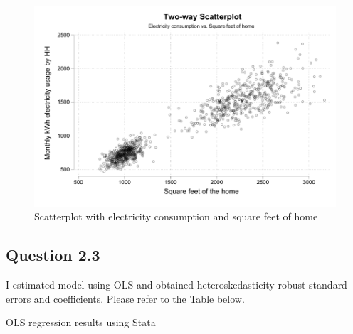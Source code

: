 \documentclass{article}
\begin{document}
\begin{figure}[hbt!]
    \centering
    \includegraphics[scale = 0.7]{homework 2/output/figure/scatterplot.pdf}
    \caption{Scatterplot with electricity consumption and square feet of home}
    \label{tab:scatter}
\end{figure}

\FloatBarrier
\subsection*{Question 2.3}
I estimated model using OLS and obtained heteroskedasticity robust standard errors and coefficients. Please refer to the Table below. 

\begin{table}[hbt!]
    \centering
    
    \caption{OLS regression results using Stata}
     \label{tab:robust_table}
  \end{table}
\end{document}
